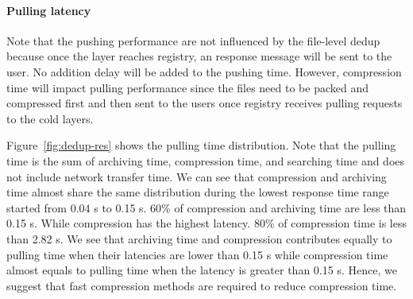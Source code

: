 \paragraph{Pulling latency}
Note that the pushing performance are not influenced by the file-level dedup because once the layer reaches registry,
an response message will be sent to the user.
%
%
No addition delay will be added to the pushing time. However, compression time will impact pulling performance since the files need to be packed and compressed first and then sent to the users once registry receives pulling requests to the cold layers. 

Figure~\ref{fig:dedup-res} shows the pulling time distribution. Note that the pulling time is the sum of archiving time, compression time, and searching time and does not include network transfer time. We can see that 
compression and archiving time almost share the same distribution during the lowest response time range started from 0.04 s to 0.15 s. 60\% of compression and archiving time are less than 0.15 s. While compression has the highest latency. 80\% of compression time is less than 2.82 s. We see that archiving time and compression contributes equally to pulling time when their latencies are lower than 0.15 s while compression time almost equals to pulling time when the latency is greater than 0.15 s. Hence, we suggest that fast compression methods are required to reduce compression time.  
%
 


